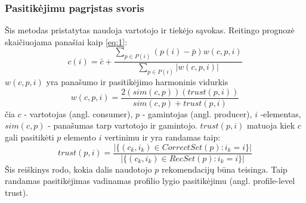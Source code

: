 \documentclass{VUMIFInfMagistrinis}
\begin{document}
\subsubsection{Pasitikėjimu pagrįstas svoris}
Šis metodas pristatytas \cite{12} naudoja vartotojo ir tiekėjo sąvokas. Reitingo prognozė skaičiuojama panašiai kaip \eqref{eq:1}:
\begin{equation}
c(i) = \bar{c}+\frac{\sum \limits_{p \in P(i)} (p(i) - \bar{p}) w(c,p,i)}{\sum \limits_{p \in P(i)} |w(c,p,i)|}
\end{equation}
$w(c,p,i)$ yra panašumo ir pasitikėjimo harmoninis vidurkis 
\begin{equation}
w(c,p,i) = \frac{2(sim(c,p))(trust(p,i))}{sim(c,p)+trust(p,i)}
\end{equation}
čia $c$ - vartotojas (angl. consumer), $p$ - gamintojas (angl. producer), $i$ -elementas, $sim(c, p)$ - panašumas tarp vartotojo ir gamintojo. $trust(p,i)$ matuoja kiek $c$ gali pasitikėti $p$ elemento $i$ vertinimu ir yra randamas taip:
\begin{equation}
trust(p,i)=\frac{|\{(c_k, i_k) \in CorrectSet(p): i_k = i\}|}{|\{(c_k,i_k) \in RecSet(p): i_k=i\}|}
\end{equation}
Šis reiškinys rodo, kokia dalis naudotojo $p$ rekomendacijų būna teisinga. Taip randamas pasitikėjimas vadinamas profilio lygio pasitikėjimu (angl. profile-level trust).
\end{document}
